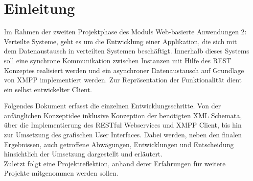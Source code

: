 
\chapter{Einleitung}

Im Rahmen der zweiten Projektphase des Moduls Web-basierte Anwendungen 2: Verteilte Systeme, geht es um die Entwicklung einer Applikation, die sich mit dem Datenaustausch in verteilten Systemen beschäftigt. Innerhalb dieses Systems soll eine synchrone Kommunikation zwischen Instanzen mit Hilfe des REST Konzeptes realisiert werden und ein asynchroner Datenaustausch auf Grundlage von XMPP implementiert werden. Zur Repräsentation der Funktionalität dient ein selbst entwickelter Client.

\vspace{0.2cm}

Folgendes Dokument erfasst die einzelnen Entwicklungsschritte. Von der anfänglichen Konzeptidee inklusive Konzeption der benötigten XML Schemata, über die Implementierung des RESTful Webservices und XMPP Client, bis hin zur Umsetzung des grafischen User Interfaces. Dabei werden, neben den finalen Ergebnissen, auch getroffene Abwägungen, Entwicklungen und Entscheidung hinsichtlich der Umsetzung dargestellt und erläutert.\\
Zuletzt folgt eine Projektreflektion, anhand derer Erfahrungen für weitere Projekte mitgenommen werden sollen.

